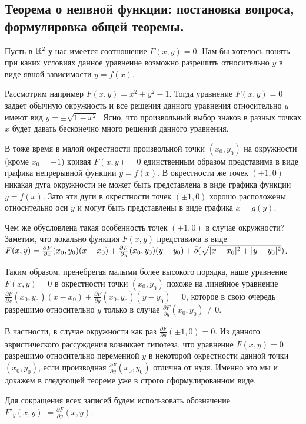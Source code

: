 \documentclass[a4paper]{article}
\theoremstyle{named}
\begin{document}
    \subsection{Теорема о неявной функции: постановка вопроса, формулировка общей теоремы.}

    Пусть в $\mathbb{R}^2$ у нас имеется соотношение $F(x,y)=0$. Нам бы хотелось понять при каких условиях данное уравнение возможно разрешить относительно $y$ в виде явной зависимости $y=f(x)$. 
    
    Рассмотрим например $F(x,y)=x^2+y^2-1$. Тогда уравнение $F(x,y)=0$ задает обычную окружность
    и все решения данного уравнения относительно $y$ имеют вид $y=\pm \sqrt{1-x^2}$.
    Ясно, что произвольный выбор знаков в разных точках $x$ будет давать бесконечно много решений данного уравнения.

    В тоже время в малой окрестности произвольной точки $(x_0,y_0)$ на окружности (кроме $x_0=\pm1$) кривая $F(x,y)=0$ единственным образом представима в виде графика непрерывной функции $y=f(x)$.
    В окрестности же точек $(\pm1,0)$ никакая дуга окружности не может быть представлена в виде графика функции $y=f(x)$.
    Зато эти дуги в окрестности точек $(\pm1,0)$ хорошо расположены относительно оси $y$ и могут быть представлены в виде графика $x=g(y)$.

    Чем же обусловлена такая особенность точек $(\pm1,0)$ в случае окружности? Заметим, что локально функция $F(x,y)$ представима в виде $F(x,y) = \frac{\partial F}{\partial x}(x_0,y_0)(x-x_0) + \frac{\partial F}{\partial y}(x_0,y_0)(y-y_0) + \bar{\bar{o}}(\sqrt{|x-x_0|^2+|y-y_0|^2})$.

    Таким образом, пренебрегая малыми более высокого порядка, наше уравнение $F(x,y)=0$ в окрестности точки $(x_0,y_0)$ похоже на линейное уравнение $\frac{\partial F}{\partial x}(x_0,y_0)(x-x_0) + \frac{\partial F}{\partial y}(x_0,y_0)(y-y_0)=0$, которое в свою очередь разрешимо относительно $y$ только в случае $\frac{\partial F}{\partial y}(x_0,y_0)\ne0$.

    В частности, в случае окружности как раз $\frac{\partial F}{\partial y}(\pm1,0)=0$. Из данного эвристического рассуждения возникает гипотеза, что уравнение $F(x,y)=0$ разрешимо относительно переменной $y$ в некоторой окрестности данной точки $(x_0,y_0)$, если производная $\frac{\partial F}{\partial y}(x_0,y_0)$ отлична от нуля. Именно это мы и докажем в следующей теореме уже в строго сформулированном виде.

    Для сокращения всех записей будем использовать обозначение $F'_y(x,y):=\frac{\partial F}{\partial y}(x,y)$.
\end{document}
